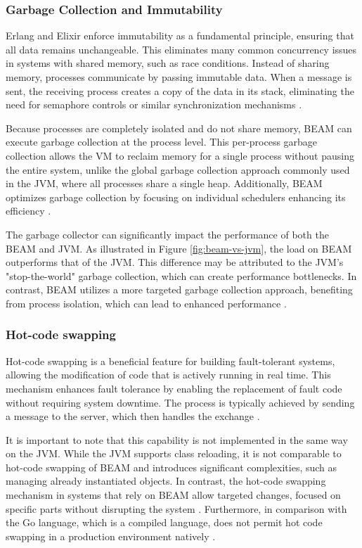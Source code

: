 \subsubsection{Garbage Collection and Immutability}

Erlang and Elixir enforce immutability as a fundamental principle, ensuring that all data remains unchangeable. This eliminates many common concurrency issues in systems with shared memory, such as race conditions. Instead of sharing memory, processes communicate by passing immutable data. When a message is sent, the receiving process creates a copy of the data in its stack, eliminating the need for semaphore controls or similar synchronization mechanisms \cite{Juric2024,erlang-concurrency-blog}.

Because processes are completely isolated and do not share memory, \gls{BEAM} can execute garbage collection at the process level. This per-process garbage collection allows the \gls{VM} to reclaim memory for a single process without pausing the entire system, unlike the global garbage collection approach commonly used in the \gls{JVM}, where all processes share a single heap. Additionally, \gls{BEAM} optimizes garbage collection by focusing on individual schedulers enhancing its efficiency \cite{Armstrong2013,Juric2024}.

The garbage collector can significantly impact the performance of both the \gls{BEAM} and \gls{JVM}. As illustrated in Figure \ref{fig:beam-vs-jvm}, the load on \gls{BEAM} outperforms that of the \gls{JVM}. This difference may be attributed to the \gls{JVM}'s "stop-the-world" garbage collection, which can create performance bottlenecks. In contrast, \gls{BEAM} utilizes a more targeted garbage collection approach, benefiting from process isolation, which can lead to enhanced performance \cite{Valkov2018, Juric2024}.

\subsubsection{Hot-code swapping}

Hot-code swapping is a beneficial feature for building fault-tolerant systems, allowing the modification of code that is actively running in real time. This mechanism enhances fault tolerance by enabling the replacement of fault code without requiring system downtime. The process is typically achieved by sending a message to the server, which then handles the exchange \cite{Armstrong2013}.

It is important to note that this capability is not implemented in the same way on the \gls{JVM}. While the \gls{JVM} supports class reloading, it is not comparable to hot-code swapping of \gls{BEAM} and introduces significant complexities, such as managing already instantiated objects. In contrast, the hot-code swapping mechanism in systems that rely on \gls{BEAM} allow targeted changes, focused on specific parts without disrupting the system \cite{erlang-concurrency-blog}. Furthermore, in comparison with the Go language, which is a compiled language, does not permit hot code swapping in a production environment natively \cite{go-docs}.

